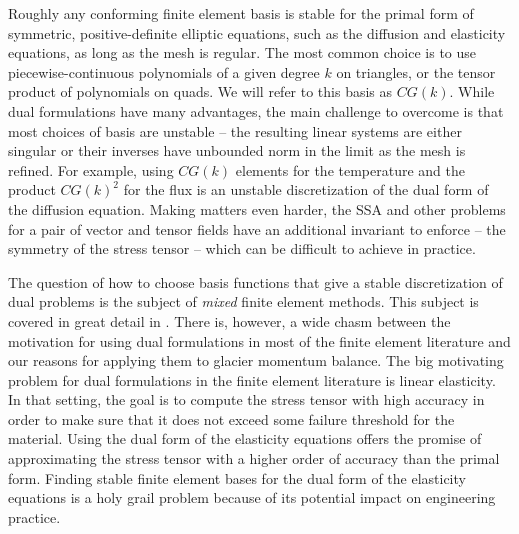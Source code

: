 \documentclass[twocolumn,letterpaper]{igs}
\begin{document}
Roughly any conforming finite element basis is stable for the primal form of symmetric, positive-definite elliptic equations, such as the diffusion and elasticity equations, as long as the mesh is regular.
The most common choice is to use piecewise-continuous polynomials of a given degree $k$ on triangles, or the tensor product of polynomials on quads.
We will refer to this basis as $CG(k)$.
While dual formulations have many advantages, the main challenge to overcome is that most choices of basis are unstable -- the resulting linear systems are either singular or their inverses have unbounded norm in the limit as the mesh is refined.
For example, using $CG(k)$ elements for the temperature and the product $CG(k)^2$ for the flux is an unstable discretization of the dual form of the diffusion equation.
Making matters even harder, the SSA and other problems for a pair of vector and tensor fields have an additional invariant to enforce -- the symmetry of the stress tensor -- which can be difficult to achieve in practice.

The question of how to choose basis functions that give a stable discretization of dual problems is the subject of \emph{mixed} finite element methods.
This subject is covered in great detail in \citet{boffi2013mixed}.
There is, however, a wide chasm between the motivation for using dual formulations in most of the finite element literature and our reasons for applying them to glacier momentum balance.
The big motivating problem for dual formulations in the finite element literature is linear elasticity.
In that setting, the goal is to compute the stress tensor with high accuracy in order to make sure that it does not exceed some failure threshold for the material.
Using the dual form of the elasticity equations offers the promise of approximating the stress tensor with a higher order of accuracy than the primal form.
Finding stable finite element bases for the dual form of the elasticity equations is a holy grail problem because of its potential impact on engineering practice.
\end{document}

